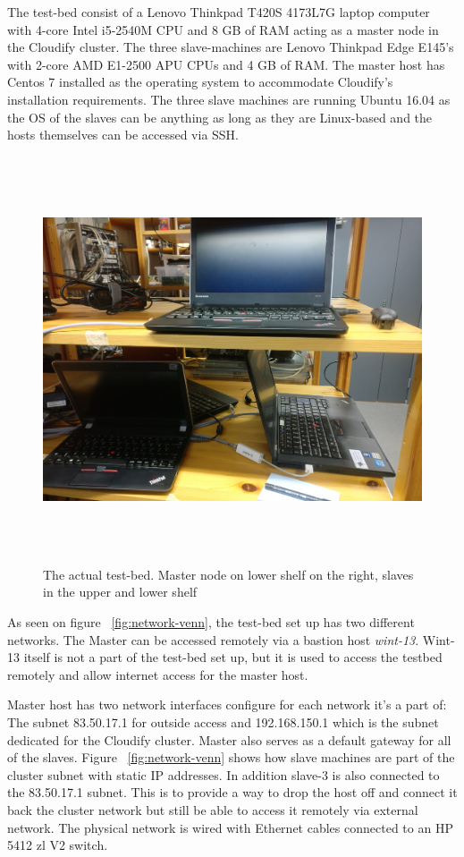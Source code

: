 The test-bed consist of a Lenovo Thinkpad T420S 4173L7G laptop computer with  4-core Intel i5-2540M CPU and 8 GB of RAM acting as a master node in the Cloudify cluster. The three slave-machines are Lenovo Thinkpad Edge E145's with 2-core AMD E1-2500 APU CPUs and 4 GB of RAM. The master host has Centos 7 installed as the operating system to accommodate Cloudify's installation requirements. The three slave machines are running Ubuntu 16.04 as the OS of the slaves can be anything as long as they are Linux-based and the hosts themselves can be accessed via SSH.

\begin{figure}
\centering
  \includegraphics[width=12cm,height=12cm, keepaspectratio]{testbed.jpg}%
  \caption{The actual test-bed. Master node on lower shelf on the right, slaves in the upper and lower shelf}
  \label{fig:test-bed}
\end{figure}

As seen on figure ~\ref{fig:network-venn}, the test-bed set up has two different networks. The Master can be accessed remotely via a bastion host \textit{wint-13}. Wint-13 itself is not a part of the test-bed set up, but it is used to access the testbed remotely and allow internet access for the master host.

Master host has two network interfaces configure for each network it's a part of: The subnet 83.50.17.1 for outside access and 192.168.150.1 which is the subnet dedicated for the Cloudify cluster. Master also serves as a default gateway for all of the slaves. Figure ~\ref{fig:network-venn} shows how slave machines are part of the cluster subnet with static IP addresses. In addition slave-3 is also connected to the 83.50.17.1 subnet. This is to provide a way to drop the host off and connect it back the cluster network but still be able to access it remotely via external network. The physical network is wired with Ethernet cables connected to an HP 5412 zl V2 switch.

